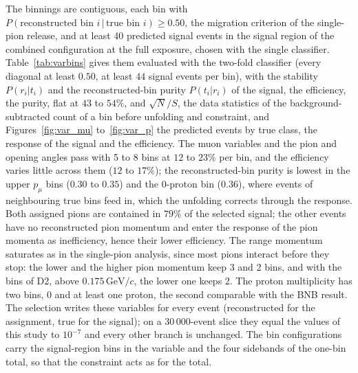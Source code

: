 \documentclass[11pt,a4paper]{article}
\newcommand{\GeVc}{\,\text{GeV}\!/c}
\begin{document}
The binnings are contiguous, each bin with $P(\text{reconstructed bin }i\,|\,\text{true bin }i)\geq0.50$, the
migration criterion of the single-pion release, and at least 40 predicted signal events in the signal region of the
combined configuration at the full exposure, chosen with the single classifier. Table~\ref{tab:varbins} gives them
evaluated with the two-fold classifier (every diagonal at least $0.50$, at least $44$ signal events per bin), with the stability $P(r_i|t_i)$ and the reconstructed-bin purity $P(t_i|r_i)$ of
the signal, the efficiency, the purity, flat at $43$ to $54\%$, and $\sqrt{N}/S$, the data statistics of the
background-subtracted count of a bin before unfolding and constraint, and
Figures~\ref{fig:var_mu} to~\ref{fig:var_p} the predicted events by true class, the response of the signal and the
efficiency. The muon variables and the pion and opening angles pass with 5 to 8 bins at $12$ to $23\%$ per bin, and
the efficiency varies little across them ($12$ to $17\%$); the reconstructed-bin purity is lowest in the upper $p_\mu$
bins ($0.30$ to $0.35$) and the 0-proton bin ($0.36$), where events of neighbouring true bins feed in, which the
unfolding corrects through the response. Both assigned pions are contained in $79\%$ of the selected signal; the other events have no reconstructed pion
momentum and enter the response of the pion momenta as inefficiency, hence their lower efficiency. The range momentum saturates as in the single-pion analysis, since most pions interact before they stop:
the lower and the higher pion momentum keep 3 and 2 bins, and with the bins of D2, above $0.175\GeVc$, the lower one
keeps 2. The proton multiplicity has two bins, 0 and at least one proton, the second comparable with the BNB result.
The selection writes these variables for every event (reconstructed for the assignment, true for the signal); on a
30\,000-event slice they equal the values of this study to $10^{-7}$ and every other branch is unchanged. The bin
configurations carry the signal-region bins in the variable and the four sidebands of the one-bin total, so that the
constraint acts as for the total.
\end{document}
